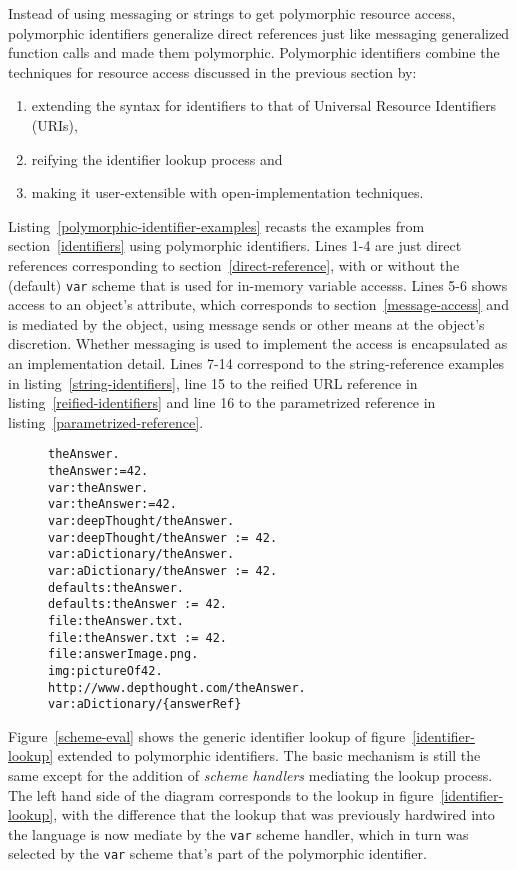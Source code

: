 \documentclass[preprint,authoryear]{acm_proc_article-sp}
\begin{document}
Instead of using messaging or strings to get polymorphic resource access, polymorphic identifiers
generalize direct references  just like messaging generalized function calls and made them polymorphic.
Polymorphic identifiers combine the techniques for resource access discussed in the previous 
section by:
\begin{enumerate}
\item extending the syntax for identifiers to that of Universal Resource Identifiers (URIs)\cite{rfc3986},
\item reifying the identifier lookup process and
\item making it user-extensible with open-implementation techniques.
\end{enumerate}

Listing~\ref{polymorphic-identifier-examples} recasts the examples from section~\ref{identifiers} using
polymorphic identifiers.  Lines 1-4 are just direct references corresponding to section~\ref{direct-reference},
with or without the (default) {\tt var} scheme that is used for in-memory variable accesss.  
Lines 5-6 shows access to an object's attribute, which corresponds to section~\ref{message-access} and is
mediated by the object, using message sends or other means at the object's discretion.  Whether messaging
is used to implement the access is encapsulated as an implementation detail.  Lines 7-14 correspond
to the string-reference examples in listing~\ref{string-identifiers}, line 15 to the reified URL reference
in listing~\ref{reified-identifiers} and line 16 to the parametrized reference in listing~\ref{parametrized-reference}.

\begin{figure}[htbp]
\begin{lstlisting}[style=numbers,label=polymorphic-identifier-examples,caption=Some variants of polymorphic identifiers.]
theAnswer.
theAnswer:=42.
var:theAnswer.
var:theAnswer:=42.
var:deepThought/theAnswer.
var:deepThought/theAnswer := 42.
var:aDictionary/theAnswer.
var:aDictionary/theAnswer := 42.
defaults:theAnswer.
defaults:theAnswer := 42.
file:theAnswer.txt.
file:theAnswer.txt := 42.
file:answerImage.png.
img:pictureOf42.
http://www.depthought.com/theAnswer.
var:aDictionary/{answerRef}
\end{lstlisting}
\end{figure}

Figure~\ref{scheme-eval} shows the generic identifier lookup of figure~\ref{identifier-lookup}
extended to polymorphic identifiers.  The basic mechanism is still the same except for the
addition of {\em scheme handlers} mediating the lookup process.  The left hand side of the
diagram corresponds to the lookup in figure~\ref{identifier-lookup}, with the difference that
the lookup that was previously hardwired into the language is now mediate by the {\tt var}
scheme handler, which in turn was selected by the {\tt var} scheme that's part of the 
polymorphic identifier.
\end{document}
